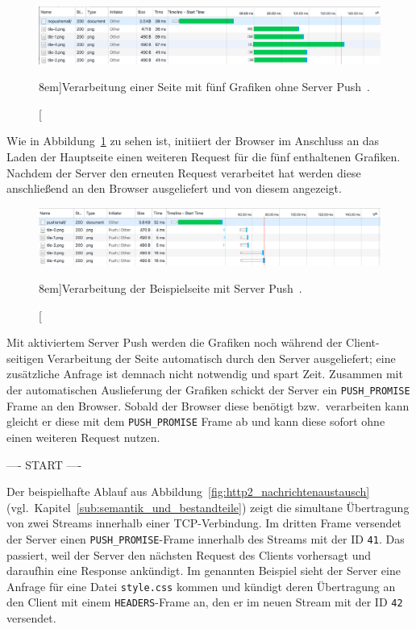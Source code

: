 \documentclass[a4paper, justified, notoc]{tufte-handout} %
\begin{document}
\begin{figure}%
	\centering
  \includegraphics[width=1.55\textwidth]{./figures/server_push_ohne.png}
  \caption[][8em]{Verarbeitung einer Seite mit fünf Grafiken ohne Server Push~\citep{vlad:2016}.}
  \label{fig:server_push_ohne}
\end{figure}
Wie in Abbildung~\ref{fig:server_push_ohne} zu sehen ist, initiiert der Browser im Anschluss an das Laden der Hauptseite einen weiteren Request für die fünf enthaltenen Grafiken. Nachdem der Server den erneuten Request verarbeitet hat werden diese anschließend an den Browser ausgeliefert und von diesem angezeigt.

\begin{figure}%
	\centering
  \includegraphics[width=1.55\textwidth]{./figures/server_push_mit.png}
  \caption[][8em]{Verarbeitung der Beispielseite mit Server Push~\citep{vlad:2016}.}
  \label{fig:server_push_mit}
\end{figure}

Mit aktiviertem Server Push werden die Grafiken noch während der Client-seitigen Verarbeitung der Seite automatisch durch den Server ausgeliefert; eine zusätzliche Anfrage ist demnach nicht notwendig und spart Zeit. Zusammen mit der automatischen Auslieferung der Grafiken schickt der Server ein \texttt{PUSH\_PROMISE} Frame an den Browser. Sobald der Browser diese benötigt bzw.\ verarbeiten kann gleicht er diese mit dem \texttt{PUSH\_PROMISE} Frame ab und kann diese sofort ohne einen weiteren Request nutzen. 


---- START ----

Der beispielhafte Ablauf aus Abbildung~\ref{fig:http2_nachrichtenaustausch} (vgl.~Kapitel~\ref{sub:semantik_und_bestandteile}) zeigt die simultane Übertragung von zwei Streams innerhalb einer TCP-Verbindung. Im dritten Frame versendet der Server einen \texttt{PUSH\_PROMISE}-Frame innerhalb des Streams mit der ID \texttt{41}. Das passiert, weil der Server den nächsten Request des Clients vorhersagt und daraufhin eine Response ankündigt. Im genannten Beispiel sieht der Server eine Anfrage für eine Datei \texttt{style.css} kommen und kündigt deren Übertragung an den Client mit einem \texttt{HEADERS}-Frame an, den er im neuen Stream mit der ID \texttt{42} versendet.
\end{document}

